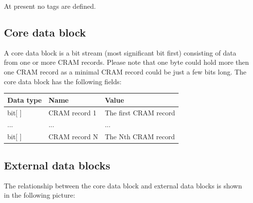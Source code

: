 \documentclass[a4paper]{article}
\begin{document}
At present no tags are defined.

%
% 


\subsection{\textbf{Core data block}}

A core data block is a bit stream (most significant bit first) consisting of data from one 
or more CRAM records. Please note that one byte could hold more then one CRAM record 
as a minimal CRAM record could be just a few bits long. The core data block has 
the following fields:

\begin{tabular}{|l|>{\raggedright}p{120pt}|>{\raggedright}p{260pt}|}
\hline
\textbf{Data type} & \textbf{Name} & \textbf{Value}
\tabularnewline
\hline
bit[ ] & CRAM record 1 & The first CRAM record\tabularnewline
\hline
... & ... & ...\tabularnewline
\hline
bit[ ] & CRAM record N & The Nth CRAM record \tabularnewline
\hline
\end{tabular}

\subsection{\textbf{External data blocks}}

The relationship between the core data block and external data blocks is shown in the following 
picture: 
\end{document}
